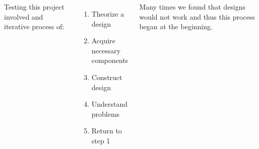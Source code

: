 \documentclass[25pt, a0paper, portrait, margin=0mm, innermargin=15mm, blockverticalspace=15mm, colspace=15mm, subcolspace=8mm]{tikzposter}
\begin{document}
\begin{columns}
{%
Testing this project involved
and iterative process of:
\begin{enumerate}
\item Theorize a design
\item Acquire necessary components
\item Construct design
\item Understand problems
\item Return to step 1
\end{enumerate}
Many times we found that designs would not work
and thus this process began at the beginning.
}

\end{columns}
\end{document}
